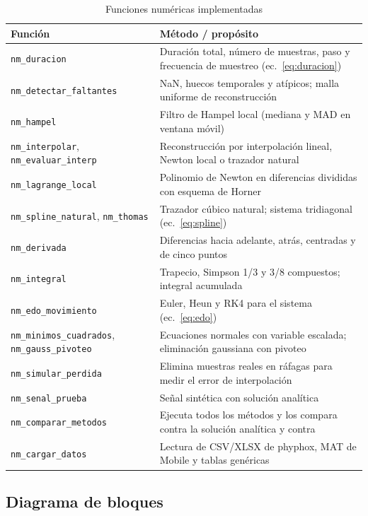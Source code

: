 \begin{table}[htbp]
\caption{Funciones numéricas implementadas}
\label{tab:funciones}
\centering\small
\begin{tabular}{@{}lp{9.4cm}@{}}
\toprule
Función & Método / propósito \\
\midrule
\texttt{nm\_duracion} & Duración total, número de muestras, paso y frecuencia de muestreo (ec.~\ref{eq:duracion}) \\
\texttt{nm\_detectar\_faltantes} & NaN, huecos temporales y atípicos; malla uniforme de reconstrucción \\
\texttt{nm\_hampel} & Filtro de Hampel local (mediana y MAD en ventana móvil) \\
\texttt{nm\_interpolar}, \texttt{nm\_evaluar\_interp} & Reconstrucción por interpolación lineal, Newton local o trazador natural \\
\texttt{nm\_lagrange\_local} & Polinomio de Newton en diferencias divididas con esquema de Horner \\
\texttt{nm\_spline\_natural}, \texttt{nm\_thomas} & Trazador cúbico natural; sistema tridiagonal (ec.~\ref{eq:spline}) \\
\texttt{nm\_derivada} & Diferencias hacia adelante, atrás, centradas y de cinco puntos \\
\texttt{nm\_integral} & Trapecio, Simpson 1/3 y 3/8 compuestos; integral acumulada \\
\texttt{nm\_edo\_movimiento} & Euler, Heun y RK4 para el sistema (ec.~\ref{eq:edo}) \\
\texttt{nm\_minimos\_cuadrados}, \texttt{nm\_gauss\_pivoteo} & Ecuaciones normales con variable escalada; eliminación gaussiana con pivoteo \\
\texttt{nm\_simular\_perdida} & Elimina muestras reales en ráfagas para medir el error de interpolación \\
\texttt{nm\_senal\_prueba} & Señal sintética con solución analítica \\
\texttt{nm\_comparar\_metodos} & Ejecuta todos los métodos y los compara contra la solución analítica y contra \matlab{} \\
\texttt{nm\_cargar\_datos} & Lectura de CSV/XLSX de phyphox, MAT de \matlab{} Mobile y tablas genéricas \\
\bottomrule
\end{tabular}
\end{table}

\subsection{Diagrama de bloques}

